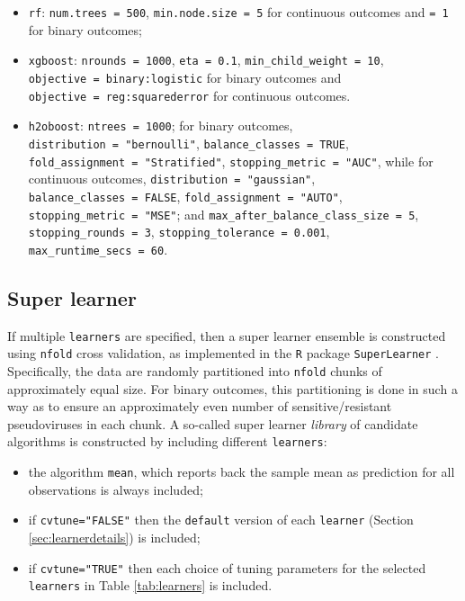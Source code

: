 \documentclass[]{article}
\providecommand{\tightlist}{%
  \setlength{\itemsep}{0pt}\setlength{\parskip}{0pt}}
\begin{document}
\begin{itemize}
\tightlist
\item
  \texttt{rf}: \texttt{num.trees\ =\ 500}, \texttt{min.node.size\ =\ 5}
  for continuous outcomes and \texttt{=\ 1} for binary outcomes;
\item
  \texttt{xgboost}: \texttt{nrounds\ =\ 1000}, \texttt{eta\ =\ 0.1},
  \texttt{min\_child\_weight\ =\ 10},
  \texttt{objective\ =\ binary:logistic} for binary outcomes and
  \texttt{objective\ =\ reg:squarederror} for continuous outcomes.
\item
  \texttt{h2oboost}: \texttt{ntrees\ =\ 1000}; for binary outcomes,
  \texttt{distribution\ =\ "bernoulli"},
  \texttt{balance\_classes\ =\ TRUE},
  \texttt{fold\_assignment\ =\ "Stratified"},
  \texttt{stopping\_metric\ =\ "AUC"}, while for continuous outcomes,
  \texttt{distribution\ =\ "gaussian"},
  \texttt{balance\_classes\ =\ FALSE},
  \texttt{fold\_assignment\ =\ "AUTO"},
  \texttt{stopping\_metric\ =\ "MSE"}; and
  \texttt{max\_after\_balance\_class\_size\ =\ 5},
  \texttt{stopping\_rounds\ =\ 3},
  \texttt{stopping\_tolerance\ =\ 0.001},
  \texttt{max\_runtime\_secs\ =\ 60}.
\end{itemize}

\subsection{Super learner}\label{sec:sldetails}

If multiple \texttt{learners} are specified, then a super learner
ensemble \citep{vanderlaan2007} is constructed using \texttt{nfold}
cross validation, as implemented in the \texttt{R} package
\texttt{SuperLearner} \citep{superlearnerpkg}. Specifically, the data
are randomly partitioned into \texttt{nfold} chunks of approximately
equal size. For binary outcomes, this partitioning is done in such a way
as to ensure an approximately even number of sensitive/resistant
pseudoviruses in each chunk. A so-called super learner \emph{library} of
candidate algorithms is constructed by including different
\texttt{learners}:

\begin{itemize}
\tightlist
\item
  the algorithm \texttt{mean}, which reports back the sample mean as
  prediction for all observations is always included;
\item
  if \texttt{cvtune="FALSE"} then the \texttt{default} version of each
  \texttt{learner} (Section \ref{sec:learnerdetails}) is included;
\item
  if \texttt{cvtune="TRUE"} then each choice of tuning parameters for
  the selected \texttt{learners} in Table \ref{tab:learners} is
  included.
\end{itemize}
\end{document}
